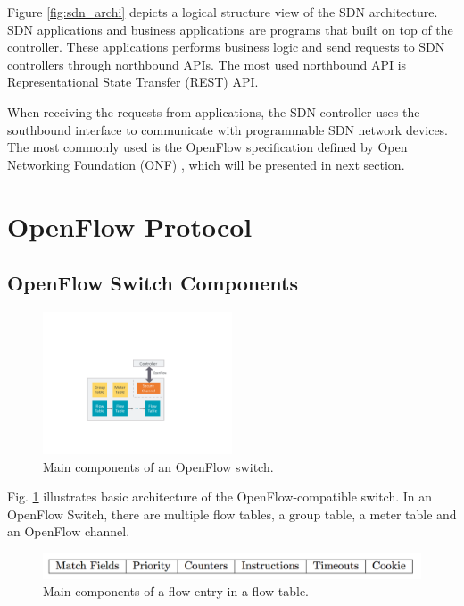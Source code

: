 Figure \ref{fig:sdn_archi} depicts a logical structure view of the SDN architecture.
SDN applications and business applications are programs that built on top of the controller.
These applications performs business logic and send requests to SDN controllers through northbound APIs.
The most used northbound API is Representational State Transfer (REST) API.

When receiving the requests from applications, the SDN controller uses the southbound interface to communicate with programmable SDN network devices.
The most commonly used is the OpenFlow specification \cite{openflow-spec} defined by Open Networking Foundation (ONF) \cite{onf}, which will be presented in next section.





\section{OpenFlow Protocol} \label{sec:openflow}
\subsection{OpenFlow Switch Components}

\begin{figure}[!ht]
\centering
\includegraphics[width=0.5\textwidth]{./fig/openflow_switch_component}
\caption{Main components of an OpenFlow switch. \cite{openflow-spec}}
\label{fig:openflow_switch_component}
\end{figure}

Fig. \ref{fig:openflow_switch_component} illustrates basic architecture of the OpenFlow-compatible switch. In an OpenFlow Switch, there are multiple flow tables, a group table, a meter table and an OpenFlow channel.

\begin{figure}[!ht]
\centering
\includegraphics[width=\textwidth]{./fig/flow_entry}
\caption{Main components of a flow entry in a flow table. \cite{openflow-spec}}
\label{fig:flow_entry}
\end{figure}

